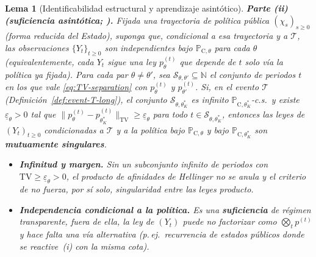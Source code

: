 \documentclass[12pt]{article}
\providecommand{\textcite}{\citet}
\newtheorem{lemma}[theorem]{Lema}
\theoremstyle{definition}
\theoremstyle{remark}
\newcommand{\ProbC}[1]{\mathbb{P}_{\mathrm{C},#1}}
\newcommand{\1}{\mathbf{1}}
\begin{document}
\begin{lemma}[Identificabilidad estructural y aprendizaje asintótico]
\medskip
\noindent\textbf{Parte \textup{(ii)} \textup{(}suficiencia asintótica; \textcite{Kakutani1948,Shiryaev2019Probability}\textup{)}.}
Fijada una trayectoria de política pública $(\chi_s)_{s\ge 0}$ \textup{(}forma reducida del Estado\textup{)}, suponga que, condicional a esa trayectoria y a $\mathcal{T}$, las observaciones $\{Y_t\}_{t\ge 0}$ son independientes bajo $\ProbC{\theta}$ para cada $\theta$ \textup{(}equivalentemente, cada $Y_t$ sigue una ley $p_\theta^{(t)}$ que depende de $t$ solo vía la política ya fijada\textup{)}. Para cada par $\theta\neq\theta'$, sea $\mathcal{S}_{\theta,\theta'}\subseteq\mathbb{N}$ el conjunto de periodos $t$ en los que vale \eqref{eq:TV-separation} con $p_\theta^{(t)}$ y $p_{\theta'}^{(t)}$. Si, en el evento $\mathcal{T}$ \textup{(}Definición~\ref{def:event-T-long}\textup{)}, el conjunto $\mathcal{S}_{\theta,\theta_K^\ast}$ es infinito $\ProbC{\theta_K^\ast}$-c.s.\ y existe $\underline{\varepsilon}_{\theta}>0$ tal que $\|p_\theta^{(t)}-p_{\theta_K^\ast}^{(t)}\|_{\mathrm{TV}}\ge \underline{\varepsilon}_{\theta}$ para todo $t\in\mathcal{S}_{\theta,\theta_K^\ast}$, entonces las leyes de $(Y_t)_{t\ge 0}$ condicionadas a $\mathcal{T}$ y a la política bajo $\ProbC{\theta}$ y bajo $\ProbC{\theta_K^\ast}$ son \textbf{mutuamente singulares}.
\begin{itemize}
  \setlength{\itemsep}{0.15em}%
  \setlength{\parsep}{0pt}%
  \item[\textup{(C3)}] \textbf{Infinitud y margen.} Sin un subconjunto infinito de periodos con $\mathrm{TV}\ge\underline{\varepsilon}_\theta>0$, el producto de afinidades de Hellinger no se anula y el criterio de \textcite{Kakutani1948} no fuerza, por sí solo, singularidad entre las leyes producto.
  \item[\textup{(C4)}] \textbf{Independencia condicional a la política.} Es una \textbf{suficiencia} de régimen transparente, fuera de ella, la ley de $(Y_t)$ puede no factorizar como $\bigotimes_t p^{(t)}$ y hace falta una vía alternativa \textup{(}p.\,ej.\ recurrencia de estados públicos donde se reactive~\textup{(i)} con la misma cota\textup{)}.
\end{itemize}



\end{lemma}
\end{document}
